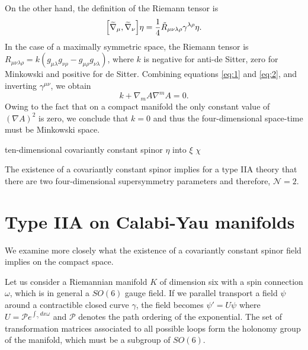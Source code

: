 On the other hand, the definition of the Riemann tensor is
\begin{equation}
  \qty[\widetilde \nabla_\mu,\widetilde \nabla_\nu]\eta=\frac{1}{4}\tilde R_{\mu\nu\lambda\rho} \gamma^{\lambda\rho}\eta.
  \label{eq:2}
\end{equation}
In the case of a maximally symmetric space, the Riemann tensor is $R_{\mu\nu\lambda\rho}=k(g_{\mu\lambda}g_{\nu\rho}-g_{\mu\rho}g_{\nu\lambda})$, where
$k$ is negative for anti-de Sitter, zero for Minkowski and positive for de Sitter.
Combining equations  \eqref{eq:1} and \eqref{eq:2}, and inverting $\gamma^{\mu\nu}$, we obtain 
\begin{equation}
  k + \nabla_m A \nabla^m A =0.
\end{equation}
Owing to the fact that on a compact manifold the only constant value of $(\nabla A)^2$ is zero,
we conclude that $k=0$ and thus the four-dimensional space-time must be Minkowski space.

ten-dimensional covariantly constant spinor $\eta$ into $\xi$ $\chi$


The existence of a covariantly constant spinor implies  for a type IIA theory that there are two four-dimensional supersymmetry parameters and therefore, $\mathcal N =2$.

\section{Type IIA on Calabi-Yau manifolds}
We examine more closely what the existence of a covariantly constant spinor field implies on the compact space. 


Let us consider a Riemannian manifold $K$ of dimension six with a spin connection $\omega$, which 
is in general a $SO(6)$ gauge field.
If we parallel transport a field $\psi$ around a contractible closed curve $\gamma$, the field becomes
$\psi'=U\psi$ where $U=\mathcal P e^{\int_\gamma dx \omega}$ and $\mathcal P$ denotes the path ordering of 
the exponential.
The set of transformation matrices associated to all possible loops form the holonomy group of the manifold, 
which must be a subgroup of $SO(6)$.


